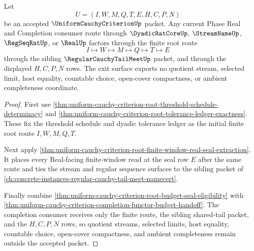 \begin{theorem}
\label{thm:uniform-cauchy-criterion-root-real-completion-exit-exhaustion}
Let
$$
U=(I,W,M,Q,T,E,H,C,P,N)
$$
be an accepted $\UniformCauchyCriterionUp$ packet. Any current Phase Real and Completion consumer route through $\DyadicRatCoreUp$, $\StreamNameUp$, $\RegSeqRatUp$, or $\RealUp$ factors through the finite root route
$$
I \longmapsto W \longmapsto M \longmapsto Q \longmapsto T \longmapsto E
$$
through the sibling $\RegularCauchyTailMeetUp$ packet, and through the displayed $H,C,P,N$ rows. The exit surface exports no quotient stream, selected limit, host equality, countable choice, open-cover compactness, or ambient completeness coordinate.
\end{theorem}
\begin{proof}
First use \autoref{thm:uniform-cauchy-criterion-root-threshold-schedule-determinacy} and \autoref{thm:uniform-cauchy-criterion-root-tolerance-ledger-exactness}. These fix the threshold schedule and dyadic tolerance ledger as the initial finite root route $I,W,M,Q,T$.

Next apply \autoref{thm:uniform-cauchy-criterion-root-finite-window-real-seal-extraction}. It places every Real-facing finite-window read at the seal row $E$ after the same route and ties the stream and regular sequence surfaces to the sibling packet of \autoref{ch:concrete-instances-regular-cauchy-tail-meet-namecert}.

Finally combine \autoref{thm:uniform-cauchy-criterion-root-budget-seal-eligibility} with \autoref{thm:uniform-cauchy-criterion-completion-functor-budget-handoff}. The completion consumer receives only the finite route, the sibling shared-tail packet, and the $H,C,P,N$ rows, so quotient streams, selected limits, host equality, countable choice, open-cover compactness, and ambient completeness remain outside the accepted packet.
\end{proof}

